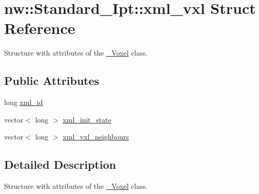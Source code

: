 \hypertarget{structnw_1_1_standard___ipt_1_1xml__vxl}{\section{nw\+:\+:Standard\+\_\+\+Ipt\+:\+:xml\+\_\+vxl Struct Reference}
\label{structnw_1_1_standard___ipt_1_1xml__vxl}
}


Structure with attributes of the \hyperlink{classnw_1_1___voxel}{\+\_\+\+Voxel} class.  


\subsection*{Public Attributes}
\begin{DoxyCompactItemize}
\item 
long \hyperlink{structnw_1_1_standard___ipt_1_1xml__vxl_aa3049a5f0e119aded3f128c9451553e1}{xml\+\_\+id}
\item 
vector$<$ long $>$ \hyperlink{structnw_1_1_standard___ipt_1_1xml__vxl_ab4f6ff40cccb2d961d94b356d6ad4eda}{xml\+\_\+init\+\_\+state}
\item 
vector$<$ long $>$ \hyperlink{structnw_1_1_standard___ipt_1_1xml__vxl_abc2d0940cccd69b37fab4029ba180150}{xml\+\_\+vxl\+\_\+neighbours}
\end{DoxyCompactItemize}


\subsection{Detailed Description}
Structure with attributes of the \hyperlink{classnw_1_1___voxel}{\+\_\+\+Voxel} class. 

